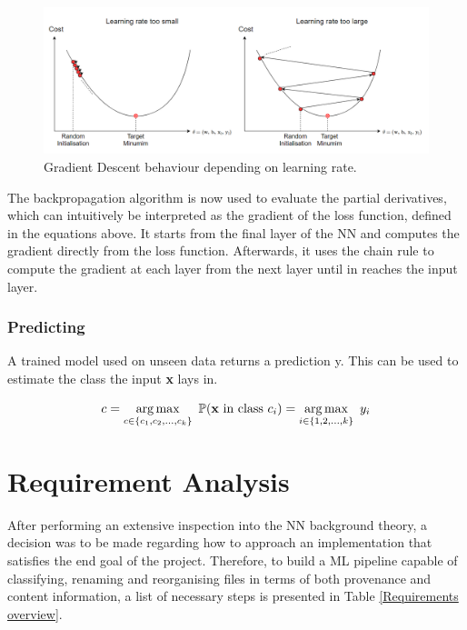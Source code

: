 \begin{figure}[H]
  \centering
  \includegraphics[scale = 0.5]{Images/learningrate.png}
  \caption{Gradient Descent behaviour depending on learning rate.}
  \label{learnrate}
\end{figure}



The backpropagation algorithm is now used to evaluate the partial derivatives, which can intuitively be interpreted as the gradient of the loss function, defined in the equations above. It starts from the final layer of the NN and computes the gradient directly from the loss function. Afterwards, it uses the chain rule to compute the gradient at each layer from the next layer until in reaches the input layer. \\



\subsubsection*{Predicting}

A trained model used on unseen data returns a prediction y. This can be used to estimate the class the input \textbf{x} lays in.

\begin{equation}
  c = \operatorname*{arg\,max}_{c \in \{ c_1, c_2, ..., c_k\}} \ \mathbb{P}(\mathbf{x} \ \text{in class} \ c_i) = \operatorname*{arg\,max}_{i \in \{ 1, 2, ..., k\}} \ y_i
\end{equation}

\section{Requirement Analysis}

After performing an extensive inspection into the NN background theory, a decision was to be made regarding how to approach an implementation that satisfies the end goal of the project. Therefore, to build a ML pipeline capable of classifying, renaming and reorganising files in terms of both provenance and content information, a list of necessary steps is presented in Table \ref{Requirements overview}. \bigskip

